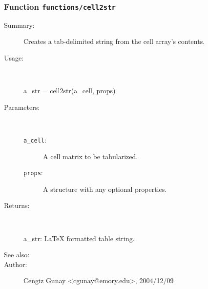 \subsubsection[Function \texttt{cell2str}]{Function \texttt{functions/cell2str}}%
%
\label{ref_functions__cell2str}%
\hypertarget{ref_functions__cell2str}{}%
\begin{description}
\item[Summary:]Creates a tab-delimited string from the cell array's contents.
%
\item[Usage:]~%
\begin{lyxcode}%
a\_str = cell2str(a\_cell, props)
%
\end{lyxcode}%
%
%
\item[Parameters:]~
\begin{description}%
\item[\texttt{a\_cell}:]
 A cell matrix to be tabularized.
\item[\texttt{props}:]
 A structure with any optional properties.
\end{description}%
%
\item[Returns:
]~

   a\_str: LaTeX formatted table string.
%
%
\item[See also:]%
%
\item[Author:]%
Cengiz Gunay <cgunay@emory.edu>, 2004/12/09
%
\end{description}
\methodline%
